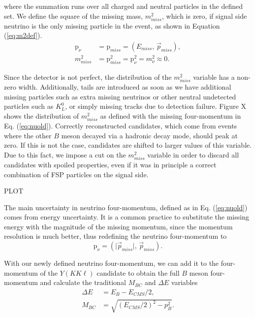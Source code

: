 \documentclass[oneside,a4paper,openany,12pt]{scrbook}
\begin{document}
where the summation runs over all charged and neutral particles in the defined set. We define the square of the missing mass, $m_{miss}^2$, which is zero, if signal side neutrino is the only missing particle in the event, as shown in Equation (\ref{eq:m2def}).
\begin{align}
\label{eq:nuold}
\mathrm{p}_\nu &= \mathrm{p}_{miss} = \left(E_{miss},\,\vec{p}_{miss} \right),\\
\label{eq:m2def}
m_{miss}^2 &= \mathrm{p}_{miss}^2 = \mathrm{p}_{\nu}^2 = m_\nu^2 \approx 0.
\end{align}

Since the detector is not perfect, the distribution of the $m_{miss}^2$ variable has a non-zero width. Additionally, tails are introduced as soon as we have additional missing particles such as extra missing neutrinos or other neutral undetected particles such as $K_L^0$, or simply missing tracks due to detection failure. Figure X shows the distribution of $m_{miss}^2$ as defined with the missing four-momentum in Eq. (\ref{eq:nuold}). Correctly reconstructed candidates, which come from events where the other $B$ meson decayed via a hadronic decay mode, should peak at zero. If this is not the case, candidates are shifted to larger values of this variable. Due to this fact, we impose a cut on the $m_{miss}^2$ variable in order to discard all candidates with spoiled properties, even if it was in principle a correct combination of FSP particles on the signal side.

\begin{center}
PLOT
\end{center}

The main uncertainty in neutrino four-momentum, defined as in Eq. (\ref{eq:nuold}) comes from energy uncertainty. It is a common practice to substitute the missing energy with the magnitude of the missing momentum, since the momentum resolution is much better, thus redefining the neutrino four-momentum to
\begin{equation}
\label{eq:nunew}
\mathrm{p}_\nu = \left(\vert \vec{p}_{miss} \vert,\,\vec{p}_{miss} \right).
\end{equation}

With our newly defined neutrino four-momentum, we can add it to the four-momentum of the $Y(KK\ell)$ candidate to obtain the full $B$ meson four-momentum and calculate the traditional $M_{BC}$ and $\Delta E$ variables
\begin{align}
\Delta E &= E_B - E_{CMS}/2,\\
M_{BC} &= \sqrt{\left(E_{CMS}/2\right)^2 - p_B^2}.
\end{align}
\end{document}
